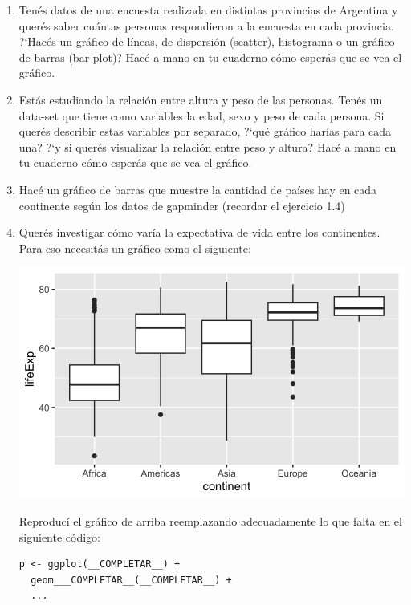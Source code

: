 \documentclass[a4paper,11pt]{article}
\theoremstyle{definition}
\begin{document}
\begin{enumerate}[resume]
\item Ten\'es datos de una encuesta realizada en distintas provincias de Argentina y quer\'es saber cu\'antas personas respondieron a la encuesta en cada provincia. ?`Hac\'es un gr\'afico de l\'ineas, de dispersi\'on (scatter), histograma o un gr\'afico de barras (bar plot)? Hac\'e a mano en tu cuaderno c\'omo esper\'as que se vea el gr\'afico.

\item Est\'as estudiando la relaci\'on entre altura y peso de las personas. Ten\'es un data-set que tiene como variables la edad, sexo y peso de cada persona. Si quer\'es describir estas variables por separado, ?`qu\'e gr\'afico har\'ias para cada una? ?`y si quer\'es visualizar la relaci\'on entre peso y altura? Hac\'e a mano en tu cuaderno c\'omo esper\'as que se vea el gr\'afico.

\item Hac\'e un gr\'afico de barras que muestre la cantidad de pa\'ises hay en cada continente seg\'un los datos de gapminder (recordar el ejercicio 1.4)

\item Quer\'es investigar c\'omo var\'ia la expectativa de vida entre los continentes. Para eso necesit\'as un gr\'afico como el siguiente:

\begin{center}
\includegraphics[scale=0.3]{practica2-img-gapminder-boxplot.png}
\end{center}

Reproduc\'i el gr\'afico de arriba reemplazando adecuadamente lo que falta en el siguiente c\'odigo:
\begin{lstlisting}
p <- ggplot(__COMPLETAR__) +
  geom___COMPLETAR__(__COMPLETAR__) +
  ...


\end{lstlisting}
\end{enumerate}
\end{document}
